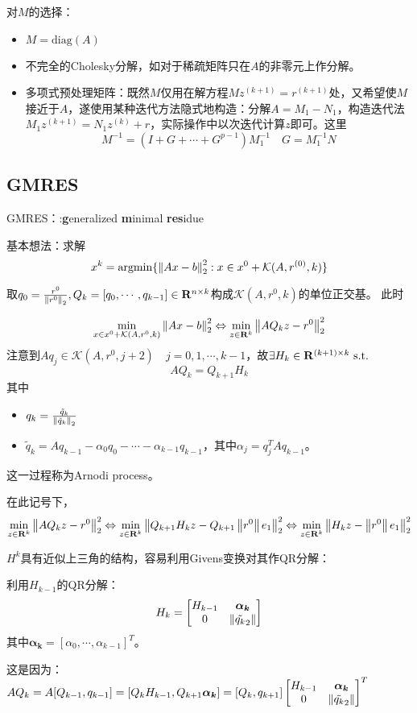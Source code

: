 \documentclass{ctexart}
\begin{document}
对$M$的选择：
\begin{itemize}
\item $M=\mathrm{diag}(A)$
\item 不完全的Cholesky分解，如对于稀疏矩阵只在$A$的非零元上作分解。
\item 多项式预处理矩阵：既然$M$仅用在解方程$Mz^{(k+1)}=r^{(k+1)}$处，又希望使$M$接近于$A$，遂使用某种迭代方法隐式地构造：分解$A=M_1-N_1$，构造迭代法$M_1z^{(k+1)}=N_1z^{(k)}+r$，实际操作中以次迭代计算$z$即可。这里
\[M^{-1}=(I+G+\cdots+G^{p-1})M_1^{-1}\quad G=M_1^{-1}N\]
\end{itemize}

\subsection{GMRES}
GMRES：:\textbf{g}eneralized \textbf{m}inimal \textbf{res}idue

基本想法：求解
\[x^k=\mathrm{argmin}\{\left\|Ax-b \right\|_2^2: x\in x^0+\mathcal{K}(A,r^{(0)},k)\}\]

取$q_0=\frac{r^0}{\left\|r^0 \right\|_2},Q_k=[q_0,\cdots,q_{k-1}]\in\mathbf{R}^{n\times k}$构成$\mathcal{K}(A,r^0,k)$的单位正交基。
此时

\[\min_{x\in x^0+\mathcal{K}(A,r^0,k)}\left\|Ax-b \right\|_2^2\Leftrightarrow \min_{z\in \mathbf{R}^k}\left\|AQ_kz-r^0 \right\|_2^2\]
注意到$Aq_j\in \mathcal{K}(A,r^0,j+2)\quad j=0,1,\cdots,k-1$，故$\exists H_k\in \mathbf{R}^{(k+1)\times k}\text{ s.t. } $
\[AQ_k=Q_{k+1}H_k\]
其中
\begin{itemize}
\item $q_k=\frac{\tilde q_k}{\left\|\tilde q_k \right\|_2}$
\item $\tilde{q}_k=Aq_{k-1}-\alpha_0q_0-\cdots-\alpha_{k-1}q_{k-1}$，其中$\alpha_j=q_j^TAq_{k-1}$。
\end{itemize}

这一过程称为Arnodi process。

在此记号下，
\[\min_{z\in\mathbf{R}^k}\left\|AQ_kz-r^0 \right\|_2^2\Leftrightarrow \min_{z\in\mathbf{R}^k}\left\|Q_{k+1}H_kz-Q_{k+1}\left\|r^0 \right\|e_1 \right\|_2^2\Leftrightarrow\min_{z\in\mathbf{R}^k}\left\|H_kz-\left\|r^0 \right\|e_1 \right\|_2^2\]

$H^k$具有近似上三角的结构，容易利用Givens变换对其作QR分解：

利用$H_{k-1}$的QR分解：
\[H_k=\begin{bmatrix}H_{k-1}&\bm{\alpha_k}\\0&\left\|\tilde{q_k}_2 \right\|\end{bmatrix}\]
其中$\bm{\alpha_k}=[\alpha_0,\cdots,\alpha_{k-1}]^T$。

这是因为：$AQ_k=A[Q_{k-1},q_{k-1}]=[Q_{k}H_{k-1},Q_{k+1}\bm{\alpha_k}]=[Q_{k},q_{k+1}]\begin{bmatrix}H_{k-1}&\bm{\alpha_k}\\0&\left\|\tilde{q_k}_2 \right\|\end{bmatrix}^T$
\end{document}
